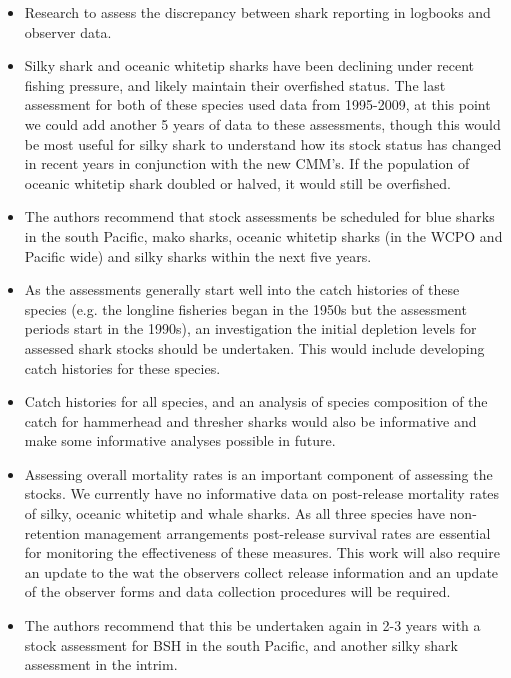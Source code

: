 \documentclass[12pt]{SCreport}
\begin{document}
 \begin{itemize}
\item Research to assess the discrepancy between shark reporting in logbooks and observer data.  
\item Silky shark and oceanic whitetip sharks have been declining under recent fishing pressure, and likely maintain their overfished status. The last assessment for both of these species used data from 1995-2009, at this point we could add another 5 years of data to these assessments, though this would be most useful for silky shark to understand how its stock status has changed in recent years in conjunction with the new CMM's. If the population of oceanic whitetip shark doubled or halved, it would still be overfished.
\item The authors recommend that stock assessments be scheduled for blue sharks in the south Pacific, mako sharks, oceanic whitetip sharks (in the WCPO and Pacific wide) and silky sharks within the next five years.   
\item As the assessments generally start well into the catch histories of these species (e.g. the longline fisheries began in the 1950s but the assessment periods start in the 1990s), an investigation the initial depletion levels for assessed shark stocks should be undertaken. This would include developing catch histories for these species. 
\item Catch histories for all species, and an analysis of species composition of the catch for hammerhead and thresher sharks would also be informative and make some informative analyses possible in future. 
\item Assessing overall mortality rates is an important component of assessing the stocks. We currently have no informative data on post-release mortality rates of silky, oceanic whitetip and whale sharks. As all three species have non-retention management arrangements post-release survival rates are essential for monitoring the effectiveness of these measures. This work will also require an update to the wat the observers collect release information and an update of the observer forms and data collection procedures will be required. 

\item The authors recommend that this be undertaken again in 2-3 years with a stock assessment for BSH in the south Pacific, and another silky shark assessment in the intrim. 




\end{itemize}
\end{document}
